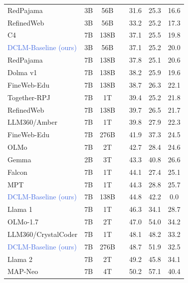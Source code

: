 \documentclass{article}
\newcommand{\cmark}{\ding{51}}
\newcommand{\xmark}{\ding{55}}
\begin{document}
\begin{table}
\begin{tabular}{lcccccc}
RedPajama & 3B & 56B & \textcolor{nicergreen}{\cmark} & 31.6 & 25.3 & 16.6 \\
RefinedWeb & 3B & 56B & \textcolor{nicergreen}{\cmark} & 33.2 & 25.2 & 17.3 \\
C4 & 7B & 138B & \textcolor{nicergreen}{\cmark} & 37.1 & 25.5 & 19.8 \\
\textcolor{RoyalBlue}{DCLM-Baseline (ours)} & 3B & 56B & \textcolor{nicergreen}{\cmark} & 37.1 & 25.2 & 20.0 \\
RedPajama & 7B & 138B & \textcolor{nicergreen}{\cmark} & 37.8 & 25.1 & 20.6 \\
Dolma v1 & 7B & 138B & \textcolor{nicergreen}{\cmark} & 38.2 & 25.9 & 19.6 \\
FineWeb-Edu & 7B & 138B & \textcolor{nicergreen}{\cmark} & 38.7 & 26.3 & 22.1 \\
Together-RPJ & 7B & 1T & \textcolor{nicergreen}{\cmark} & 39.4 & 25.2 & 21.8 \\
RefinedWeb & 7B & 138B & \textcolor{nicergreen}{\cmark} & 39.7 & 26.5 & 21.7 \\
LLM360/Amber & 7B & 1T & \textcolor{nicergreen}{\cmark} & 39.8 & 27.9 & 22.3 \\
FineWeb-Edu & 7B & 276B & \textcolor{nicergreen}{\cmark} & 41.9 & 37.3 & 24.5 \\
OLMo & 7B & 2T & \textcolor{nicergreen}{\cmark} & 42.7 & 28.4 & 24.6 \\
Gemma & 2B & 3T & \textcolor{red}{\xmark} & 43.3 & 40.8 & 26.6 \\
Falcon & 7B & 1T & \textcolor{nicergreen}{\cmark} & 44.1 & 27.4 & 25.1 \\
MPT & 7B & 1T & \textcolor{nicergreen}{\cmark} & 44.3 & 28.8 & 25.7 \\
\textcolor{RoyalBlue}{DCLM-Baseline (ours)} & 7B & 138B & \textcolor{nicergreen}{\cmark} & 44.8 & 42.2 & 0.0 \\
Llama 1 & 7B & 1T & \textcolor{red}{\xmark} & 46.3 & 34.1 & 28.7 \\
OLMo-1.7 & 7B & 2T & \textcolor{nicergreen}{\cmark} & 47.0 & 54.0 & 34.2 \\
LLM360/CrystalCoder & 7B & 1T & \textcolor{nicergreen}{\cmark} & 48.1 & 48.2 & 33.2 \\
\textcolor{RoyalBlue}{DCLM-Baseline (ours)} & 7B & 276B & \textcolor{nicergreen}{\cmark} & 48.7 & 51.9 & 32.5 \\
Llama 2 & 7B & 2T & \textcolor{red}{\xmark} & 49.2 & 45.8 & 34.1 \\
MAP-Neo & 7B & 4T & \textcolor{nicergreen}{\cmark} & 50.2 & 57.1 & 40.4 \\

\end{tabular}
\end{table}
\end{document}
